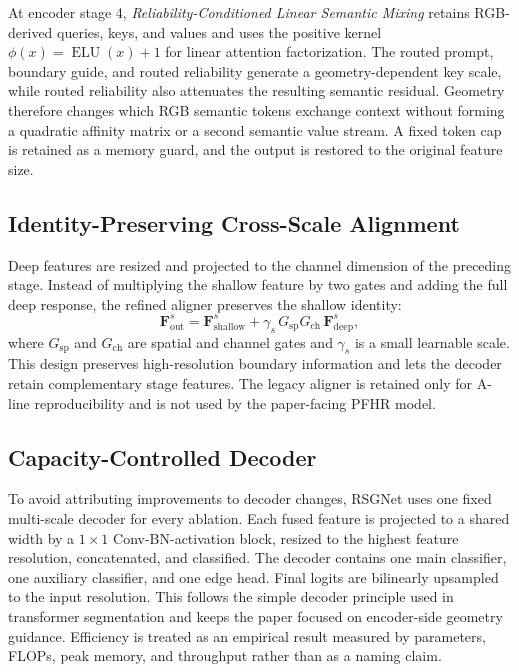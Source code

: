 \documentclass[a4paper,fleqn]{cas-dc}
\begin{document}
At encoder stage 4, \emph{Reliability-Conditioned Linear Semantic Mixing} retains RGB-derived queries, keys, and values and uses the positive kernel $\phi(x)=\operatorname{ELU}(x)+1$ for linear attention factorization. The routed prompt, boundary guide, and routed reliability generate a geometry-dependent key scale, while routed reliability also attenuates the resulting semantic residual. Geometry therefore changes which RGB semantic tokens exchange context without forming a quadratic affinity matrix or a second semantic value stream. A fixed token cap is retained as a memory guard, and the output is restored to the original feature size.

\subsection{Identity-Preserving Cross-Scale Alignment}

Deep features are resized and projected to the channel dimension of the preceding stage. Instead of multiplying the shallow feature by two gates and adding the full deep response, the refined aligner preserves the shallow identity:
\begin{equation}
  \mathbf{F}^{s}_{\mathrm{out}} = \mathbf{F}^{s}_{\mathrm{shallow}} +
  \gamma_s\,G_{\mathrm{sp}}G_{\mathrm{ch}}\,\mathbf{F}^{s}_{\mathrm{deep}},
\end{equation}
where $G_{\mathrm{sp}}$ and $G_{\mathrm{ch}}$ are spatial and channel gates and $\gamma_s$ is a small learnable scale. This design preserves high-resolution boundary information and lets the decoder retain complementary stage features. The legacy aligner is retained only for A-line reproducibility and is not used by the paper-facing PFHR model.

\subsection{Capacity-Controlled Decoder}

To avoid attributing improvements to decoder changes, RSGNet uses one fixed multi-scale decoder for every ablation. Each fused feature is projected to a shared width by a $1\times1$ Conv-BN-activation block, resized to the highest feature resolution, concatenated, and classified. The decoder contains one main classifier, one auxiliary classifier, and one edge head. Final logits are bilinearly upsampled to the input resolution. This follows the simple decoder principle used in transformer segmentation \citep{xie2021segformer} and keeps the paper focused on encoder-side geometry guidance. Efficiency is treated as an empirical result measured by parameters, FLOPs, peak memory, and throughput rather than as a naming claim.
\end{document}
